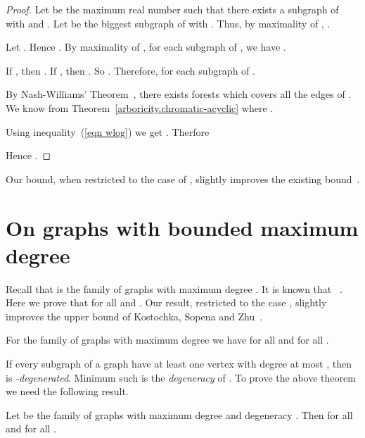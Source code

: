 \documentclass[11pt]{article}
\begin{document}
\begin{proof}
Let  be the maximum real number such that there exists a subgraph  of  with  and .
Let  be the biggest subgraph of  with . Thus, by maximality of , .

Let . Hence .
By maximality of , for each subgraph  of , we have .


If , then . If , then . So . Therefore,  for each subgraph  of .

By Nash-Williams' Theorem~\cite{nash1page}, there exists  forests  which covers all the edges of . We know from Theorem~\ref{arboricity.chromatic-acyclic}  where . 


Using  inequality~(\ref{eqn wlog}) we get . Therfore




Hence .
\end{proof}



Our bound, when restricted to the case of , slightly improves the existing bound~\cite{Kostochka97acyclicand}.

















\section{On graphs with bounded maximum degree}
Recall that   is the family of graphs with maximum degree  . 
It is known that ~\cite{Kostochka97acyclicand}. 
Here we prove that  for all  and . 
Our result, restricted 
to the case , slightly improves the upper bound of Kostochka, Sopena and Zhu~\cite{Kostochka97acyclicand}.

\begin{theorem}\label{chromatic-degree}
For the family   of graphs with maximum degree  
 we have   for all  and for all .
\end{theorem}

If every subgraph of a graph  have at least one vertex with degree at most , then  is \textit{-degenerated}.  
Minimum such  is the \textit{degeneracy} of . To prove the above theorem we need the following result.

\begin{theorem}\label{chromatic-degree.degeneracy}
Let   be the family of graphs with maximum degree   and degeneracy . Then 
   for all  and for all .
\end{theorem}
\end{document}
